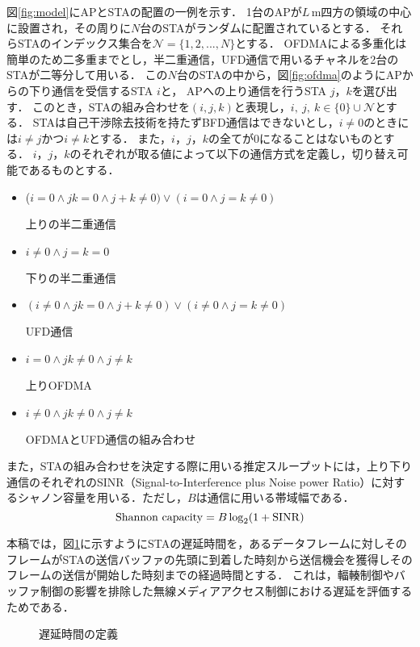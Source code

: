 \documentclass[technicalreport]{ieicej}
\newcommand{\sijk}{(i,j,k)}
\newcommand{\mN}{{\mathcal N}}
\begin{document}
	図\ref{fig:model}にAPとSTAの配置の一例を示す．
	1台のAPが$L$\,m四方の領域の中心に設置され，その周りに$N$台のSTAがランダムに配置されているとする．
	それらSTAのインデックス集合を$\mN=\{1,2,...,N\}$とする．
	OFDMAによる多重化は簡単のため二多重までとし，半二重通信，UFD通信で用いるチャネルを2台のSTAが二等分して用いる．
	この$N$台のSTAの中から，図\ref{fig:ofdma}のようにAPからの下り通信を受信するSTA $i$と，
	APへの上り通信を行うSTA $j$，$k$を選び出す．
	このとき，STAの組み合わせを$\sijk$と表現し，$i,\ j,\ k \in \{0\}\cup \mN$とする．
	STAは自己干渉除去技術を持たずBFD通信はできないとし，$i\neq0$のときには$i\neq j$かつ$i\neq k$とする．
	また，$i$，$j$，$k$の全てが0になることはないものとする．
	$i$，$j$，$k$のそれぞれが取る値によって以下の通信方式を定義し，切り替え可能であるものとする．
	\begin{itemize}%
		\item ($i=0\land jk=0\land j+k\neq0)\lor (i=0\land j=k\neq0)$\par
			\hspace*{15pt}上りの半二重通信
		\item $i\neq0\land j=k=0$\par
			\hspace*{15pt}下りの半二重通信
		\item $(i\neq0\land jk=0 \land j+k\neq0)\lor(i\neq0\land j=k\neq0)$\par
			\hspace*{15pt}UFD通信
		\item $i=0\land jk\neq0 \land j\neq k$\par
			\hspace*{15pt}上りOFDMA
		\item $i\neq0 \land jk\neq0 \land j\neq k$\par
			\hspace*{15pt}OFDMAとUFD通信の組み合わせ
	\end{itemize}
	\par
	また，STAの組み合わせを決定する際に用いる推定スループットには，上り下り通信のそれぞれのSINR（Signal-to-Interference plus Noise power Ratio）に対するシャノン容量を用いる．ただし，$B$は通信に用いる帯域幅である．
	\begin{equation}
		{\rm Shannon\ capacity}=B\log_2(1+{\rm SINR}) \label{eq:capacity}
	\end{equation}
	\par
	本稿では，図\ref{fig:standby}に示すようにSTAの遅延時間を，あるデータフレームに対しそのフレームがSTAの送信バッファの先頭に到着した時刻から送信機会を獲得しそのフレームの送信が開始した時刻までの経過時間とする．
	これは，輻輳制御やバッファ制御の影響を排除した無線メディアアクセス制御における遅延を評価するためである．
	\begin{figure}[t]
		\centering
		\caption{遅延時間の定義}
		\label{fig:standby}
	\end{figure}
\end{document}
